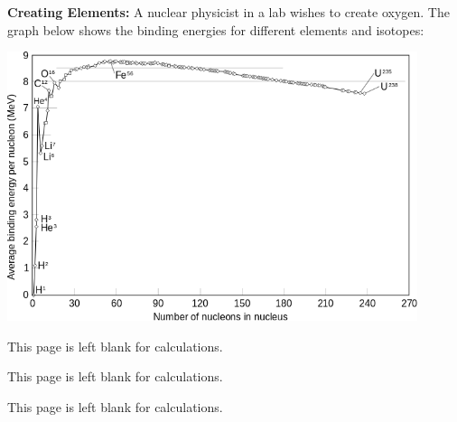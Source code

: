 \documentclass[addpoints,12pt]{exam}
\begin{document}
\begin{questions}
\clearpage
\bonusquestion \textbf{Creating Elements:} A nuclear physicist in a lab wishes to create oxygen. The graph below shows the binding energies for different elements and isotopes:
\noindent\begin{center}
\includegraphics[width=0.9\textwidth]{../images/bindingEnergies.png}
\end{center}
\end{questions}

\clearpage
This page is left blank for calculations.

\clearpage
This page is left blank for calculations.

\clearpage
This page is left blank for calculations.
\end{document}
